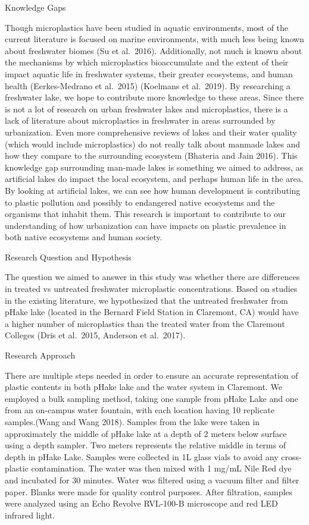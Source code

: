 \documentclass[]{article}
\begin{document}
Knowledge Gaps

Though microplastics have been studied in aquatic environments, most of
the current literature is focused on marine environments, with much less
being known about freshwater biomes (Su et al.~2016). Additionally, not
much is known about the mechanisms by which microplastics bioaccumulate
and the extent of their impact aquatic life in freshwater systems, their
greater ecosystems, and human health (Eerkes-Medrano et al.~2015)
(Koelmans et al.~2019). By researching a freshwater lake, we hope to
contribute more knowledge to these areas. Since there is not a lot of
research on urban freshwater lakes and microplastics, there is a lack of
literature about microplastics in freshwater in areas surrounded by
urbanization. Even more comprehensive reviews of lakes and their water
quality (which would include microplastics) do not really talk about
manmade lakes and how they compare to the surrounding ecosystem
(Bhateria and Jain 2016). This knowledge gap surrounding man-made lakes
is something we aimed to address, as artificial lakes do impact the
local ecosystem, and perhaps human life in the area. By looking at
artificial lakes, we can see how human development is contributing to
plastic pollution and possibly to endangered native ecosystems and the
organisms that inhabit them. This research is important to contribute to
our understanding of how urbanization can have impacts on plastic
prevalence in both native ecosystems and human society.

Research Question and Hypothesis

The question we aimed to answer in this study was whether there are
differences in treated vs untreated freshwater microplastic
concentrations. Based on studies in the existing literature, we
hypothesized that the untreated freshwater from pHake lake (located in
the Bernard Field Station in Claremont, CA) would have a higher number
of microplastics than the treated water from the Claremont Colleges
(Dris et al.~2015, Anderson et al.~2017).

Research Approach

There are multiple steps needed in order to ensure an accurate
representation of plastic contents in both pHake lake and the water
system in Claremont. We employed a bulk sampling method, taking one
sample from pHake Lake and one from an on-campus water fountain, with
each location having 10 replicate samples.(Wang and Wang 2018). Samples
from the lake were taken in approximately the middle of pHake lake at a
depth of 2 meters below surface using a depth sampler. Two meters
represents the relative middle in terms of depth in pHake Lake. Samples
were collected in 1L glass vials to avoid any cross-plastic
contamination. The water was then mixed with 1 mg/mL Nile Red dye and
incubated for 30 minutes. Water was filtered using a vacuum filter and
filter paper. Blanks were made for quality control purposes. After
filtration, samples were analyzed using an Echo Revolve RVL-100-B
microscope and red LED infrared light.
\end{document}
